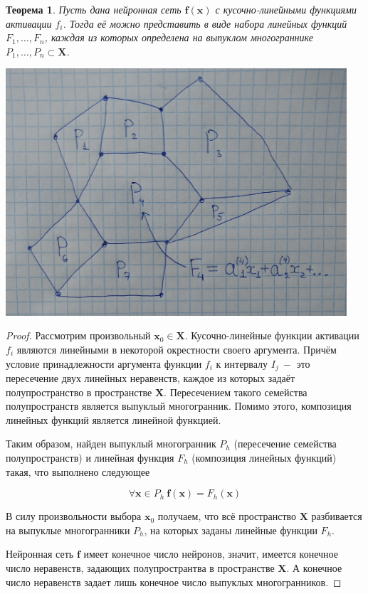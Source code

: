\documentclass[a4paper, 12pt]{article}
\newtheorem{theorem}{Теорема}
\begin{document}
\begin{theorem}
Пусть дана нейронная сеть $\mathbf{f}(\mathbf{x})$ с кусочно-линейными функциями активации $f_i$. Тогда её можно представить в виде набора линейных функций $F_1,\dots,F_n$, каждая из которых определена на выпуклом многограннике $P_1,\dots,P_n \subset \mathbf{X}$.
\end{theorem}
\includegraphics[width=0.95\textwidth]{../figures/polys.jpg}
\begin{proof}
Рассмотрим произвольный $\mathbf{x}_0\in\mathbf{X}$. Кусочно-линейные функции активации $f_i$ являются линейными в некоторой окрестности своего аргумента. Причём условие принадлежности аргумента функции $f_i$ к интервалу $I_j~-$ это пересечение двух линейных неравенств, каждое из которых задаёт полупространство в пространстве $\mathbf{X}$. Пересечением такого семейства полупространств является выпуклый многогранник. Помимо этого, композиция линейных функций является линейной функцией.

Таким образом, найден выпуклый многогранник $P_h$ (пересечение семейства полупространств) и линейная функция $F_h$ (композиция линейных функций) такая, что выполнено следующее

$$\forall \mathbf{x}\in P_h\: \mathbf{f}(\mathbf{x})=F_h(\mathbf{x})$$

В силу произвольности выбора $\mathbf{x}_0$ получаем, что всё пространство $\mathbf{X}$ разбивается на выпуклые многогранники $P_h$, на которых заданы линейные функции $F_h$.

Нейронная сеть $\mathbf{f}$ имеет конечное число нейронов, значит, имеется конечное число неравенств, задающих полупространтва в пространстве $\mathbf{X}$. А конечное число неравенств задает лишь конечное число выпуклых многогранников. 
\end{proof}
\end{document}
